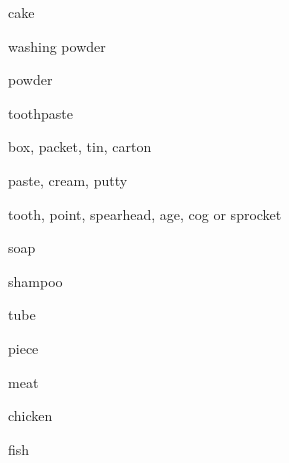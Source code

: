 \begin{flashcard}{\LARGE cake}
\LARGE {}
\end{flashcard}
\begin{flashcard}{\LARGE washing powder}
\LARGE {}
\end{flashcard}
\begin{flashcard}{\LARGE powder}
\LARGE {}
\end{flashcard}
\begin{flashcard}{\LARGE toothpaste}
\LARGE {}
\end{flashcard}
\begin{flashcard}{\LARGE box, packet, tin, carton}
\LARGE {}
\end{flashcard}
\begin{flashcard}{\LARGE paste, cream, putty}
\LARGE {}
\end{flashcard}
\begin{flashcard}{\LARGE tooth, point, spearhead, age, cog or sprocket}
\LARGE {}
\end{flashcard}
\begin{flashcard}{\LARGE soap}
\LARGE {}
\end{flashcard}
\begin{flashcard}{\LARGE shampoo}
\LARGE {}
\end{flashcard}
\begin{flashcard}{\LARGE tube}
\LARGE {}
\end{flashcard}
\begin{flashcard}{\LARGE piece}
\LARGE {}
\end{flashcard}
\begin{flashcard}{\LARGE meat}
\LARGE {}
\end{flashcard}
\begin{flashcard}{\LARGE chicken}
\LARGE {}
\end{flashcard}
\begin{flashcard}{\LARGE fish}
\LARGE {}
\end{flashcard}
